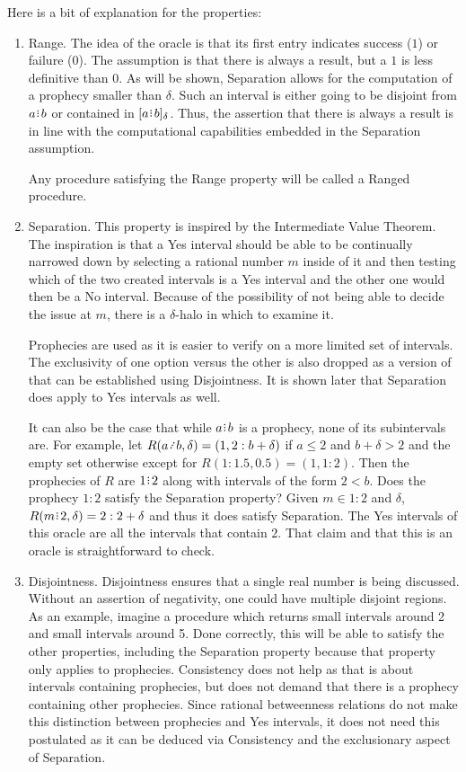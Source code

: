 \documentclass[12pt]{article}
\begin{document}
Here is a bit of explanation for the properties: 
\begin{enumerate}
    \item Range. The idea of the oracle is that its first entry indicates success ($1$) or failure ($0$). The assumption is that there is always a result, but a $1$ is less definitive than $0$. As will be shown, Separation allows for the computation of a prophecy smaller than $\delta$. Such an interval is either going to be disjoint from $a \rint b$ or contained in $\halo{a\rint b}$. Thus, the assertion that there is always a result is in line with the computational capabilities embedded in the Separation assumption. 

    Any procedure satisfying the Range property will be called a Ranged procedure. 
    

    \item Separation. This property is inspired by the Intermediate Value Theorem. The inspiration is that a Yes interval should be able to be continually narrowed down by selecting a rational number $m$ inside of it and then testing which of the two created intervals is a Yes interval and the other one would then be a No interval. Because of the possibility of not being able to decide the issue at $m$, there is a $\delta$-halo in which to examine it. 

    Prophecies are used as it is easier to verify on a more limited set of intervals. The exclusivity of one option versus the other is also dropped as a version of that can be established using Disjointness. It is shown later that Separation does apply to Yes intervals as well. 
    
    It can also be the case that while $a\rint b$ is a prophecy, none of its subintervals are. For example, let $R(a \lte  b, \delta) = (1, 2: b+ \delta)$ if $a \leq 2$ and $b + \delta > 2$ and the empty set otherwise except for $R(1:1.5, 0.5) = (1, 1:2)$. Then the prophecies of $R$ are  $1\rint 2$ along with intervals of the form $2 \lt b$. Does the prophecy $1:2$ satisfy the Separation property? Given $m \in 1:2$ and $\delta$, $R(m \rint 2, \delta) = 2:2+\delta$ and thus it does satisfy Separation. The Yes intervals of this oracle are all the intervals that contain $2$. That claim and that this is an oracle is straightforward to check.  
    
 
    \item Disjointness. Disjointness ensures that a single real number is being discussed. Without an assertion of negativity, one could have multiple disjoint regions.  As an example, imagine a procedure which returns small intervals around 2 and small intervals around 5. Done correctly, this will be able to satisfy the other properties, including the Separation property because that property only applies to prophecies. Consistency does not help as that is about intervals containing prophecies, but does not demand that there is a prophecy containing other prophecies.  Since rational betweenness relations do not make this distinction between prophecies and Yes intervals, it does not need this postulated as it can be deduced via Consistency and the exclusionary aspect of Separation. 
    

\end{enumerate}
\end{document}
